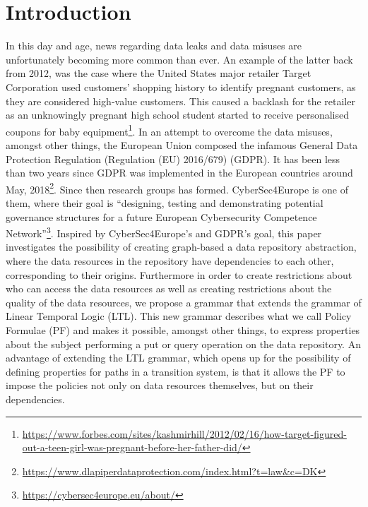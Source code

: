 \section{Introduction}
In this day and age, news regarding data leaks and data misuses are unfortunately becoming more common than ever. An example of the latter back from 2012, was the case where the United States major retailer Target Corporation used customers' shopping history to identify pregnant customers, as they are considered high-value customers. This caused a backlash for the retailer as an unknowingly pregnant high school student started to receive personalised coupons for baby equipment\footnote{\url{https://www.forbes.com/sites/kashmirhill/2012/02/16/how-target-figured-out-a-teen-girl-was-pregnant-before-her-father-did/}}. In an attempt to overcome the data misuses, amongst other things, the European Union composed the infamous General Data Protection Regulation (Regulation (EU) 2016/679) (GDPR). It has been less than two years since GDPR was implemented in the European countries around May, 2018\footnote{\url{https://www.dlapiperdataprotection.com/index.html?t=law&c=DK}}. Since then research groups has formed. CyberSec4Europe is one of them, where their goal is ``designing, testing and demonstrating potential governance structures for a future European Cybersecurity Competence Network''\footnote{\url{https://cybersec4europe.eu/about/}}. Inspired by CyberSec4Europe's and GDPR's goal, this paper investigates the possibility of creating graph-based a data repository abstraction, where the data resources in the repository have dependencies to each other, corresponding to their origins. Furthermore in order to create restrictions about who can access the data resources as well as creating restrictions about the quality of the data resources, we propose a grammar that extends the grammar of Linear Temporal Logic (LTL). This new grammar describes what we call Policy Formulae (PF) and makes it possible, amongst other things, to express properties about the subject performing a put or query operation on the data repository. An advantage of extending the LTL grammar, which opens up for the possibility of defining properties for paths in a transition system, is that it allows the PF to impose the policies not only on data resources themselves, but on their dependencies.

